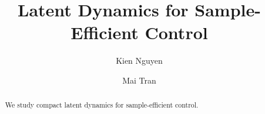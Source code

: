 \documentclass[11pt]{article}
\title{Latent Dynamics for Sample-Efficient Control}
\author{Kien Nguyen \and Mai Tran}
\date{}
\begin{document}
\maketitle
\begin{abstract}
We study compact latent dynamics for sample-efficient control.
\end{abstract}





\end{document}
